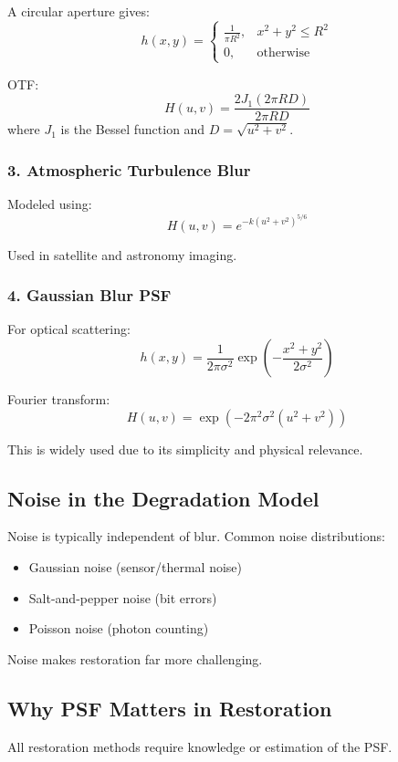 \documentclass{AnantDocumentation}
\begin{document}
A circular aperture gives:
\[
h(x,y) =
\begin{cases}
\frac{1}{\pi R^2}, & x^2 + y^2 \le R^2 \\
0, & \text{otherwise}
\end{cases}
\]

OTF:
\[
H(u,v) = \frac{2 J_1 (2\pi R D)}{2\pi R D}
\]
where \( J_1 \) is the Bessel function and \( D=\sqrt{u^2+v^2} \).

\subsubsection{3. Atmospheric Turbulence Blur}

Modeled using:
\[
H(u,v) = e^{-k(u^2+v^2)^{5/6}}
\]

Used in satellite and astronomy imaging.

\subsubsection{4. Gaussian Blur PSF}

For optical scattering:
\[
h(x,y) = \frac{1}{2\pi\sigma^2} \exp\left( -\frac{x^2 + y^2}{2\sigma^2} \right)
\]

Fourier transform:
\[
H(u,v) = \exp\left( -2\pi^2\sigma^2(u^2+v^2) \right)
\]

This is widely used due to its simplicity and physical relevance.

\subsection{Noise in the Degradation Model}

Noise is typically independent of blur.  
Common noise distributions:
\begin{itemize}
\item Gaussian noise (sensor/thermal noise)
\item Salt-and-pepper noise (bit errors)
\item Poisson noise (photon counting)
\end{itemize}

Noise makes restoration far more challenging.

\subsection{Why PSF Matters in Restoration}

All restoration methods require knowledge or estimation of the PSF.
\end{document}
